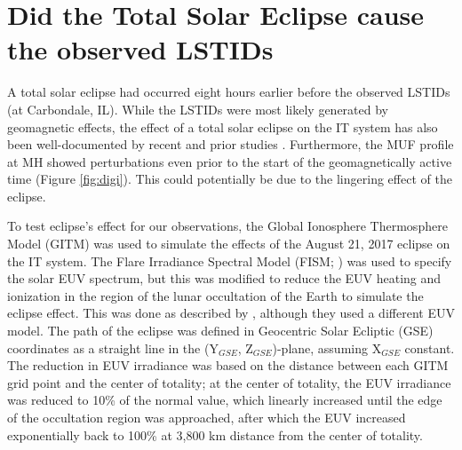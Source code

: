 \documentclass[crop=false,class=mitthesis,oneside,font=12pt]{standalone}
\begin{document}
\section{Did the Total Solar Eclipse cause the observed LSTIDs}
A total solar eclipse had occurred eight hours earlier before the observed LSTIDs (at Carbondale, IL). While the LSTIDs were most likely generated by geomagnetic effects, the effect of a total solar eclipse on the IT system has also been well-documented by recent and prior studies  \citep[e.g.,][]{coster_gnss_2017,Mrak2018,liu_1998}. Furthermore, the MUF profile at  MH showed perturbations even prior to the start of the geomagnetically active time (Figure \ref{fig:digi}). This could potentially be due to the lingering effect of the eclipse.  

To test eclipse's effect for our observations, the Global Ionosphere Thermosphere Model (GITM) \citep{ridley_global_2006} was used to simulate the effects of the August 21, 2017 eclipse on the IT system. The Flare Irradiance Spectral Model (FISM; \cite{Chamberlin2007}) was used to specify the solar EUV spectrum, but this was modified to reduce the EUV heating and ionization in the region of the lunar occultation of the Earth to simulate the eclipse effect.
This was done as described by \citet{wu_gitm-data_2018}, although they used a different EUV model. The path of the eclipse was defined in Geocentric Solar Ecliptic (GSE) coordinates as a straight line in the (Y$_{GSE}$, Z$_{GSE}$)-plane, assuming X$_{GSE}$ constant. The reduction in EUV irradiance was based on the distance between each GITM grid point and the center of totality; at the center of totality, the EUV irradiance was reduced to 10\% of the normal value, which linearly increased until the edge of the occultation region was approached, after which the EUV increased exponentially back to 100\% at 3,800 km distance from the center of totality.
% 
% 
% 
\end{document}
